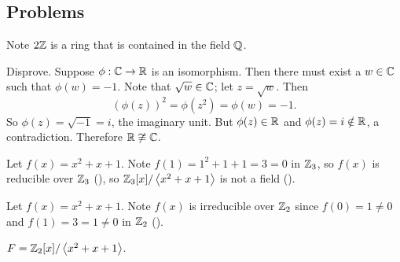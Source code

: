 \subsection*{Problems}
\begin{questions}
    \item Note $2\mathbb{Z}$ is a ring that is contained in the field $\mathbb{Q}$.

    \item Disprove. Suppose $\phi: \mathbb{C} \to \mathbb{R}$ is an isomorphism. Then there must exist a $w \in \mathbb{C}$ such that $\phi(w) = -1$. Note that $\sqrt{w} \in \mathbb{C}$; let $z = \sqrt{w}$. Then
    \[
        \left(\phi(z)\right)^2 = \phi\left(z^2\right) = \phi(w) = -1.
    \]
    So $\phi(z) = \sqrt{-1} = i$, the imaginary unit. But $\phi(z) \in \mathbb{R}$ and $\phi(z) = i \notin \mathbb{R}$, a contradiction. Therefore $\mathbb{R} \not\cong \mathbb{C}$.

    \item Let $f(x) = x^2 + x + 1$. Note $f(1) = 1^2 + 1 + 1 = 3 = 0$ in $\mathbb{Z}_3$, so $f(x)$ is reducible over $\mathbb{Z}_3$ (), so $\mathbb{Z}_3[x]/\left\langle x^2+x+1\right\rangle$ is not a field ().

    \item Let $f(x) = x^2 + x + 1$. Note $f(x)$ is irreducible over $\mathbb{Z}_2$ since $f(0) = 1 \neq 0$ and $f(1) = 3 = 1 \neq 0$ in $\mathbb{Z}_2$ ().

    $F = \mathbb{Z}_2[x]/\left\langle x^2+x+1\right\rangle$.


\end{questions}
